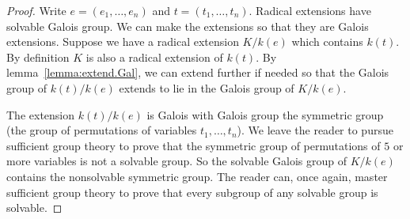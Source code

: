\begin{proof}
Write \(e=(e_1,\dots,e_n)\) and \(t=(t_1,\dots,t_n)\).
Radical extensions have solvable Galois group.
We can make the extensions so that they are Galois extensions.
Suppose we have a radical extension \(K/k(e)\) which contains \(k(t)\).
By definition \(K\) is also a radical extension of \(k(t)\).
By lemma~\vref{lemma:extend.Gal}, we can extend further if needed so that the Galois group of \(k(t)/k(e)\) extends to lie in the Galois group of \(K/k(e)\).

The extension \(k(t)/k(e)\) is Galois with Galois group the symmetric group (the group of permutations of variables \(t_1,\dots,t_n\)).
We leave the reader to pursue sufficient group theory to prove that the symmetric group of permutations of \(5\) or more variables is not a solvable group.
So the solvable Galois group of \(K/k(e)\) contains the nonsolvable symmetric group.
The reader can, once again, master sufficient group theory to prove that every subgroup of any solvable group is solvable.
\end{proof}
